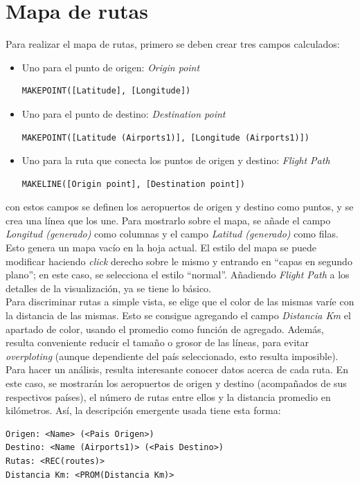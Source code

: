 \documentclass[11pt]{opticajnl}
\begin{document}
\section{Mapa de rutas}

Para realizar el mapa de rutas, primero se deben crear tres campos calculados:
\begin{itemize}
\item Uno para el punto de origen: \textit{Origin point}
\begin{lstlisting}[style=terminal]
MAKEPOINT([Latitude], [Longitude])
\end{lstlisting}
\item Uno para el punto de destino: \textit{Destination point}
\begin{lstlisting}[style=terminal]
MAKEPOINT([Latitude (Airports1)], [Longitude (Airports1)])
\end{lstlisting}
\item Uno para la ruta que conecta los puntos de origen y destino: \textit{Flight Path}
\begin{lstlisting}[style=terminal]
MAKELINE([Origin point], [Destination point])
\end{lstlisting}
\end{itemize}

con estos campos se definen los aeropuertos de origen y destino como puntos, y se crea una línea que los une. Para mostrarlo sobre el mapa, se añade el campo \textit{Longitud (generado)} como columnas y el campo \textit{Latitud (generado)} como filas. Esto genera un mapa vacío en la hoja actual. El estilo del mapa se puede modificar haciendo \textit{click} derecho sobre le mismo y entrando en ``capas en segundo plano''; en este caso, se selecciona el estilo ``normal''. Añadiendo \textit{Flight Path} a los detalles de la visualización, ya se tiene lo básico. \\

Para discriminar rutas a simple vista, se elige que el color de las mismas varíe con la distancia de las mismas. Esto se consigue agregando el campo \textit{Distancia Km} el apartado de color, usando el promedio como función de agregado. Además, resulta conveniente reducir el tamaño o grosor de las líneas, para evitar \textit{overploting} (aunque dependiente del país seleccionado, esto resulta imposible). \\

Para hacer un análisis, resulta interesante conocer datos acerca de cada ruta. En este caso, se mostrarán los aeropuertos de origen y destino (acompañados de sus respectivos países), el número de rutas entre ellos y la distancia promedio en kilómetros. Así, la descripción emergente usada tiene esta forma: 
\begin{lstlisting}[style=terminal]
Origen:	<Name> (<Pais Origen>)
Destino: <Name (Airports1)> (<Pais Destino>)
Rutas: <REC(routes)>
Distancia Km: <PROM(Distancia Km)>
\end{lstlisting}
\end{document}
